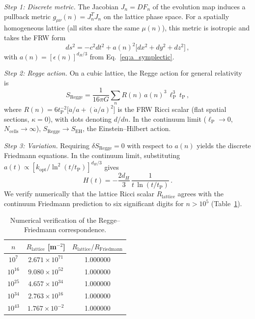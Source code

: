 \documentclass[twocolumn,showpacs,preprintnumbers,amsmath,amssymb,prd]{revtex4-2}
\newcommand{\lnq}{\ln^2}
\newcommand{\tP}{t_{\mathrm{P}}}
\newcommand{\lP}{\ell_{\mathrm{P}}}
\begin{document}
\emph{Step 1: Discrete metric.}
The Jacobian $J_n = DF_n$ of the evolution map induces a
pullback metric $g_{\mu\nu}(n) = J_n^T J_n$ on the lattice
phase space.
For a spatially homogeneous lattice (all sites share the same
$\mu(n)$), this metric is isotropic and takes the FRW form
\begin{equation}
  ds^2 = -c^2 dt^2 + a(n)^2\bigl[dx^2 + dy^2 + dz^2\bigr]\,,
  \label{eq:FRW}
\end{equation}
with $a(n) = [\epsilon(n)]^{d_H/3}$ from
Eq.~\eqref{eq:a_symplectic}.

\emph{Step 2: Regge action.}
On a cubic lattice, the Regge action for general relativity
is~\cite{Regge1961,Williams1992}
\begin{equation}
  S_{\mathrm{Regge}} = \frac{1}{16\pi G}\sum_{n}
  R(n)\,a(n)^3\,\lP^3\,\tP\,,
  \label{eq:Regge}
\end{equation}
where $R(n) = 6\tP^{-2}\bigl[\ddot a/a + (\dot a/a)^2\bigr]$
is the FRW Ricci scalar (flat spatial sections, $\kappa=0$),
with dots denoting $d/dn$.
In the continuum limit ($\lP \to 0$, $N_{\mathrm{cells}}\to\infty$),
$S_{\mathrm{Regge}} \to S_{\mathrm{EH}}$, the Einstein--Hilbert
action.

\emph{Step 3: Variation.}
Requiring $\delta S_{\mathrm{Regge}} = 0$ with respect to $a(n)$
yields the discrete Friedmann equations.
In the continuum limit, substituting $a(t) \propto
[k_{\mathrm{opt}}/\lnq(t/\tP)]^{d_H/3}$ gives
\begin{equation}
  H(t) = -\frac{2d_H}{3}\,\frac{1}{t\,\ln(t/\tP)}\,.
  \label{eq:H_regge}
\end{equation}
We verify numerically that the lattice Ricci scalar $R_{\mathrm{lattice}}$
agrees with the continuum Friedmann prediction to six significant
digits for $n > 10^5$ (Table~\ref{tab:regge}).

\begin{table}[h]
\caption{Numerical verification of the Regge--Friedmann correspondence.}
\label{tab:regge}
\begin{ruledtabular}
\begin{tabular}{ccc}
 $n$ & $R_{\mathrm{lattice}}$ [m$^{-2}$] & $R_{\mathrm{lattice}}/R_{\mathrm{Friedmann}}$ \\
\hline
$10^{7}$  & $2.671\times10^{71}$  & 1.000000 \\
$10^{16}$ & $9.080\times10^{52}$  & 1.000000 \\
$10^{25}$ & $4.657\times10^{34}$  & 1.000000 \\
$10^{34}$ & $2.763\times10^{16}$  & 1.000000 \\
$10^{43}$ & $1.767\times10^{-2}$  & 1.000000 \\
\end{tabular}
\end{ruledtabular}
\end{table}
\end{document}
